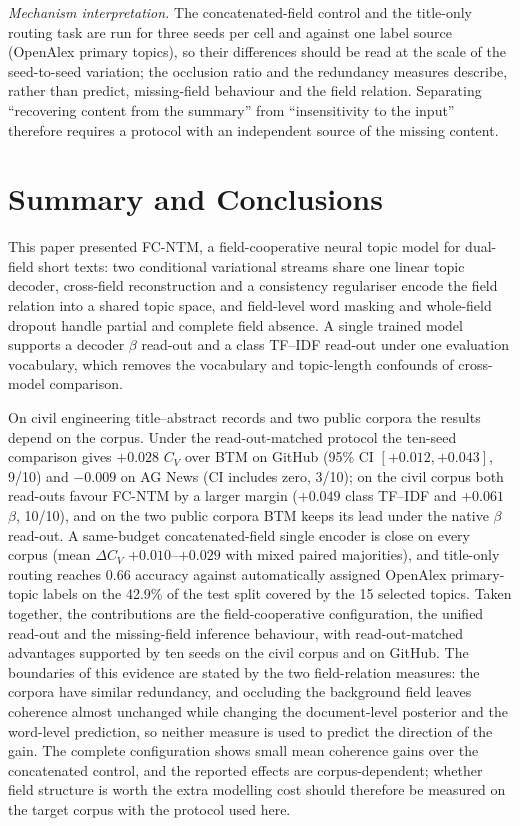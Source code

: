 \documentclass[Journal,letterpaper,NoLists]{ascelike-new}
\newcommand{\fcntm}{FC-NTM}
\begin{document}
\emph{Mechanism interpretation.} The concatenated-field control and the title-only routing task
are run for three seeds per cell and against one label source (OpenAlex primary topics), so their
differences should be read at the scale of the seed-to-seed variation; the occlusion ratio and the
redundancy measures describe, rather than predict, missing-field behaviour and the field relation.
Separating ``recovering content from the summary'' from ``insensitivity to the input'' therefore
requires a protocol with an independent source of the missing content.

\section{Summary and Conclusions}

This paper presented \fcntm{}, a field-cooperative neural topic model for dual-field short texts:
two conditional variational streams share one linear topic decoder, cross-field reconstruction and a
consistency regulariser encode the field relation into a shared topic space, and field-level word
masking and whole-field dropout handle partial and complete field absence. A single trained model
supports a decoder $\beta$ read-out and a class TF--IDF read-out under one evaluation vocabulary,
which removes the vocabulary and topic-length confounds of cross-model comparison.

On civil engineering title--abstract records and two public corpora the results depend on the
corpus. Under the read-out-matched protocol the ten-seed comparison gives $+0.028$ $C_V$ over BTM on
GitHub (95\% CI $[+0.012,+0.043]$, 9/10) and $-0.009$ on AG News (CI includes zero, 3/10); on the
civil corpus both read-outs favour \fcntm{} by a larger margin ($+0.049$ class TF--IDF and
$+0.061$ $\beta$, 10/10), and on the two public corpora BTM keeps its lead under the native $\beta$ read-out. A same-budget concatenated-field single encoder is close on every corpus (mean
$\Delta C_V$ $+0.010$--$+0.029$ with mixed paired majorities), and title-only routing reaches
0.66 accuracy against automatically assigned OpenAlex primary-topic labels on the 42.9\% of the test
split covered by the 15 selected topics. Taken together, the contributions are the field-cooperative configuration, the unified read-out
and the missing-field inference behaviour, with read-out-matched advantages supported by ten seeds on
the civil corpus and on GitHub. The boundaries of this evidence are stated by the two field-relation
measures: the corpora have similar redundancy, and occluding the background field leaves coherence
almost unchanged while changing the document-level posterior and the word-level prediction, so neither
measure is used to predict the direction of the gain. The complete configuration shows small mean
coherence gains over the concatenated control, and the reported effects are corpus-dependent;
whether field structure is worth the extra modelling cost should therefore be measured on the
target corpus with the protocol used here.
\end{document}
